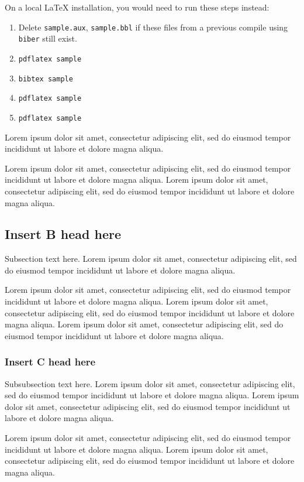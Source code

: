 \documentclass[
  journal=kielnarowa,
  year=2024,
  volume=1,
]{cup-journal}
\begin{document}
On a local \LaTeX{} installation, you would need to run these steps instead:
\begin{enumerate}
    \item Delete \texttt{sample.aux}, \texttt{sample.bbl} if these files from a previous compile using \texttt{biber} still exist.
    \item \verb|pdflatex sample|
    \item \verb|bibtex sample|
    \item \verb|pdflatex sample|
    \item \verb|pdflatex sample|
\end{enumerate}

Lorem ipsum dolor sit amet, consectetur adipiscing elit, sed do eiusmod tempor incididunt ut labore et dolore magna aliqua. 

Lorem ipsum dolor sit amet, consectetur adipiscing elit, sed do eiusmod tempor incididunt ut labore et dolore magna aliqua. Lorem ipsum dolor sit amet, consectetur adipiscing elit, sed do eiusmod tempor incididunt ut labore et dolore magna aliqua. 


\subsection{Insert B head here}
Subsection text here. Lorem ipsum\autocite{Bayer_etal_2013} dolor sit amet, consectetur adipiscing elit, sed do eiusmod tempor incididunt ut labore\autocite{Adade_etal_2007} et dolore magna aliqua. 

 Lorem ipsum dolor sit amet, consectetur adipiscing elit, sed do eiusmod tempor incididunt ut labore et dolore magna aliqua. Lorem ipsum dolor sit amet, consectetur adipiscing elit, sed do eiusmod tempor incididunt ut labore et dolore magna aliqua. Lorem ipsum dolor sit amet, consectetur adipiscing elit, sed do eiusmod tempor incididunt ut labore et dolore magna aliqua. 

\subsubsection{Insert C head here}
Subsubsection text here. Lorem ipsum dolor sit amet, consectetur adipiscing elit, sed do eiusmod tempor incididunt ut labore et dolore magna aliqua. 
Lorem ipsum dolor sit amet, consectetur adipiscing elit, sed do eiusmod tempor incididunt ut labore et dolore magna aliqua. 

Lorem ipsum dolor sit amet, consectetur adipiscing elit, sed do eiusmod tempor incididunt ut labore et dolore magna aliqua. Lorem ipsum dolor sit amet, consectetur adipiscing elit, sed do eiusmod tempor incididunt ut labore et dolore magna aliqua. 
\end{document}
